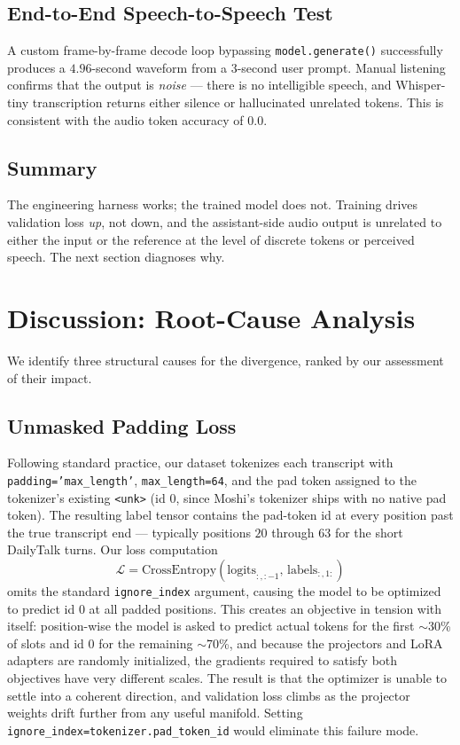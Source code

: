 \documentclass[conference]{IEEEtran}
\begin{document}
\subsection{End-to-End Speech-to-Speech Test}

A custom frame-by-frame decode loop bypassing \texttt{model.generate()} successfully produces a $4.96$-second waveform from a $3$-second user prompt. Manual listening confirms that the output is \emph{noise} --- there is no intelligible speech, and Whisper-tiny transcription returns either silence or hallucinated unrelated tokens. This is consistent with the audio token accuracy of $0.0$.

\subsection{Summary}

The engineering harness works; the trained model does not. Training drives validation loss \emph{up}, not down, and the assistant-side audio output is unrelated to either the input or the reference at the level of discrete tokens or perceived speech. The next section diagnoses why.

\section{Discussion: Root-Cause Analysis}
\label{sec:discussion}

We identify three structural causes for the divergence, ranked by our assessment of their impact.

\subsection{Unmasked Padding Loss}

Following standard practice, our dataset tokenizes each transcript with \texttt{padding='max\_length'}, \texttt{max\_length=64}, and the pad token assigned to the tokenizer's existing \texttt{<unk>} (id $0$, since Moshi's tokenizer ships with no native pad token). The resulting label tensor contains the pad-token id at every position past the true transcript end --- typically positions $20$ through $63$ for the short DailyTalk turns. Our loss computation
\begin{equation}
\mathcal{L} = \text{CrossEntropy}\!\left(\text{logits}_{:,:-1},\, \text{labels}_{:,1:}\right)
\end{equation}
omits the standard \texttt{ignore\_index} argument, causing the model to be optimized to predict id $0$ at all padded positions. This creates an objective in tension with itself: position-wise the model is asked to predict actual tokens for the first $\sim$30\% of slots and id $0$ for the remaining $\sim$70\%, and because the projectors and LoRA adapters are randomly initialized, the gradients required to satisfy both objectives have very different scales. The result is that the optimizer is unable to settle into a coherent direction, and validation loss climbs as the projector weights drift further from any useful manifold. Setting \texttt{ignore\_index=tokenizer.pad\_token\_id} would eliminate this failure mode.
\end{document}
